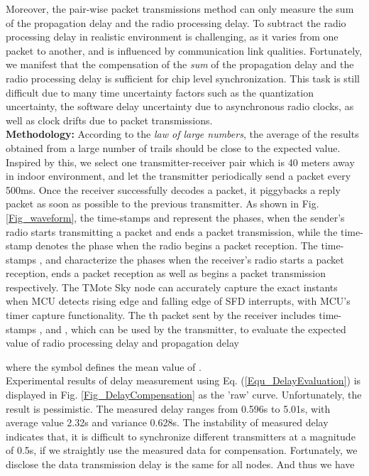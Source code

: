 \documentclass[conference]{IEEEtran}
\begin{document}
Moreover, the pair-wise packet transmissions method can only measure the sum of the propagation delay and the radio processing delay.
To subtract the radio processing delay in realistic environment is challenging, as it varies from one packet to another, and is influenced by communication link qualities.
Fortunately, we manifest that the compensation of the \emph{sum} of the propagation delay and the radio processing delay is sufficient for chip level synchronization.
This task is still difficult due to many time uncertainty factors such as the quantization uncertainty, the software delay uncertainty due to asynchronous radio clocks, as well as clock drifts due to packet transmissions.\\
\indent \textbf{Methodology:} According to the \emph{law of large numbers}, the average of the results obtained from a large number of trails should be close to the expected value.
Inspired by this, we select one transmitter-receiver pair which is 40 meters away in indoor environment, and let the transmitter periodically send a packet every 500ms.
Once the receiver successfully decodes a packet, it piggybacks a reply packet as soon as possible to the previous transmitter.
As shown in Fig. \ref{Fig_waveform}, the time-stamps  and  represent the phases, when the sender's radio starts transmitting a packet and ends a packet transmission, while the time-stamp  denotes the phase when the radio begins a packet reception.
The time-stamps ,  and  characterize the phases when the receiver's radio starts a packet reception, ends a packet reception as well as begins a packet transmission respectively.
The TMote Sky node can accurately capture the exact instants when MCU detects rising edge and falling edge of SFD interrupts, with MCU's timer capture functionality.
The th packet sent by the receiver includes time-stamps ,  and , which can be used by the transmitter, to evaluate the expected value of radio processing delay and propagation delay

where the symbol  defines the mean value of .\\
\indent Experimental results of delay measurement using Eq. (\ref{Equ_DelayEvaluation}) is displayed in Fig. \ref{Fig_DelayCompensation} as the 'raw' curve.
Unfortunately, the result is pessimistic.
The measured delay ranges from 0.596s to 5.01s, with average value 2.32s and variance 0.628s.
The instability of measured delay indicates that, it is difficult to synchronize different transmitters at a magnitude of 0.5s, if we straightly use the measured data for compensation.
Fortunately, we disclose the data transmission delay is the same for all nodes.
And thus we have
\end{document}

